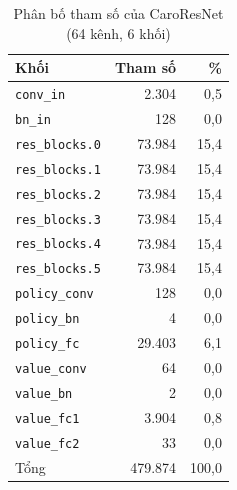 \begin{table}[H]
  \centering
  \footnotesize
  \caption{Phân bố tham số của CaroResNet (64 kênh, 6 khối)}
  \label{tab:cs-mang-thamso}
  \begin{tabular}{lrr}
    \toprule
    Khối & Tham số & \% \\
    \midrule
    \texttt{conv\_in} & 2.304 & 0,5 \\
    \texttt{bn\_in} & 128 & 0,0 \\
    \texttt{res\_blocks.0} & 73.984 & 15,4 \\
    \texttt{res\_blocks.1} & 73.984 & 15,4 \\
    \texttt{res\_blocks.2} & 73.984 & 15,4 \\
    \texttt{res\_blocks.3} & 73.984 & 15,4 \\
    \texttt{res\_blocks.4} & 73.984 & 15,4 \\
    \texttt{res\_blocks.5} & 73.984 & 15,4 \\
    \texttt{policy\_conv} & 128 & 0,0 \\
    \texttt{policy\_bn} & 4 & 0,0 \\
    \texttt{policy\_fc} & 29.403 & 6,1 \\
    \texttt{value\_conv} & 64 & 0,0 \\
    \texttt{value\_bn} & 2 & 0,0 \\
    \texttt{value\_fc1} & 3.904 & 0,8 \\
    \texttt{value\_fc2} & 33 & 0,0 \\
    \midrule
    Tổng & 479.874 & 100,0 \\
    \bottomrule
  \end{tabular}
\end{table}
